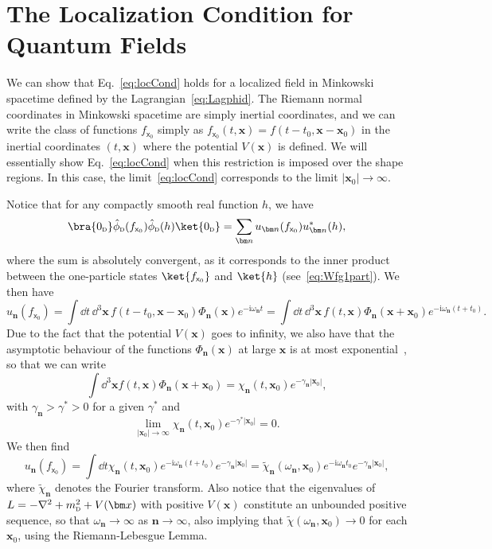 \documentclass[letterpaper,12pt,titlepage,oneside,final]{book}
\newcommand{\mf}{\mathsf}%
\newcommand{\ii}{\mathrm{i}}
\newcommand{\tc}[1]{\textsc{#1}}
\begin{document}
\chapter{The Localization Condition for Quantum Fields}\label{app:locCond}

We can show that  Eq.~\eqref{eq:locCond} holds for a localized field in Minkowski spacetime defined by the Lagrangian~\eqref{eq:Lagphid}. The Riemann normal coordinates in Minkowski spacetime are simply inertial coordinates, and we can write the class of functions ${f}_{\mf x_0}$ simply as $f_{\mf x_0}(t,\bm x) = f(t-t_0,\bm x-\bm x_0)$ in the inertial coordinates $(t,\bm x)$ where the potential $V(\bm x)$ is defined. We will essentially show Eq.~\eqref{eq:locCond} when this restriction is imposed over the shape regions. In this case, the limit~\eqref{eq:locCond} corresponds to the limit $|\bm x_0|\to \infty$. 

Notice that for any compactly smooth real function $h$, we have
\begin{equation}\label{eq:auxlocCond}
    \bra{0_\tc{d}}\hat{\phi}_\tc{d}(f_{\mf x_0})\hat{\phi}_\tc{d}(h)\ket{0_\tc{d}} = \sum_{\bm n} u_{\bm n}({f}_{\mf x_0})u_{\bm n}^*(h),
\end{equation}
where the sum is absolutely convergent, as it corresponds to the inner product between the one-particle states $\ket{f_{\mf x_0}}$ and $\ket{h}$ (see~\eqref{eq:Wfg1part}).  We then have
\begin{equation}
    u_{\bm n}(f_{\mf x_0}) = \int \dd t \,\dd^3 \bm x \, f(t-t_0,\bm x - \bm x_0) \Phi_{\bm n}(\bm x) e^{-\ii \omega_{\bm n} t} = \int \dd t \,\dd^3 \bm x \, f(t,\bm x) \Phi_{\bm n}(\bm x + \bm x_0) e^{-\ii \omega_{\bm n} (t+t_0)}. 
\end{equation}
Due to the fact that the potential $V(\bm x)$ goes to infinity, we also have that the asymptotic behaviour of the functions $\Phi_{\bm n}(\bm x)$ at large $\bm x$ is at most exponential~\cite{expDecay}, so that we can write
 \begin{equation}
     \int \dd^3 \bm x f(t,\bm x) \Phi_{\bm n}(\bm x + \bm x_0) = \chi_{\bm n}(t,\bm x_0) e^{-\gamma_{\bm n}|\bm x_0|}, 
 \end{equation}
 with $\gamma_{\bm n}> \gamma^*>0$ for a given $\gamma^*$ and
 \begin{equation}
     \lim_{|\bm x_0| \to \infty}\chi_{\bm n}(t,\bm x_0) e^{-\gamma^*|\bm x_0|} = 0.
 \end{equation}
 We then find
\begin{equation}
    u_{\bm n}(f_{\mf x_0}) = \int \dd t \chi_{\bm n}(t, \bm x_0)e^{-\ii \omega_{\bm n} (t+t_0)}e^{-\gamma_{\bm n}|\bm x_0|} = \tilde{\chi}_{\bm n}(\omega_{\bm n},\bm x_0)e^{-\ii \omega_{\bm n} t_0}e^{-\gamma_{\bm n}|\bm x_0|},
\end{equation}
where $\tilde{\chi}_{\bm n}$ denotes the Fourier transform. Also notice that the eigenvalues of $L = - \nabla^2 + m_\tc{d}^2 + V(\bm x)$ with positive $V(\bm x)$ constitute an unbounded positive sequence, so that $\omega_{\bm n}\to \infty$ as $\bm n \to \infty$, also implying that $\tilde{\chi}(\omega_{\bm n},\bm x_0)\to 0$ for each $\bm x_0$, using the Riemann-Lebesgue Lemma.
\end{document}
